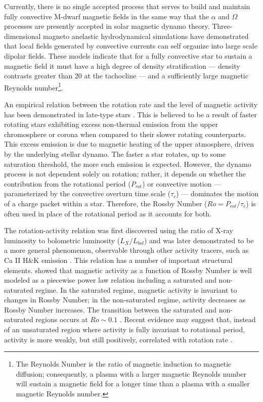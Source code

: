 Currently, there is no single accepted process that serves to build and
maintain fully convective M-dwarf magnetic fields in the same way that the
$\alpha$ and $\Omega$ processes are presently accepted in solar magnetic dynamo
theory. Three-dimensional magneto anelastic hydrodynamical simulations have
demonstrated that local fields generated by convective currents can self
organize into large scale dipolar fields. 
These models indicate that for a fully convective star to sustain a magnetic
field it must have a high degree of density stratification --- density
contrasts greater than 20 at the tachocline --- and a sufficiently large magnetic Reynolds
number\footnote{The Reynolds Number is the ratio of magnetic induction to
magnetic diffusion; consequently, a plasma with a larger magnetic Reynolds
number will  sustain a magnetic field for a longer time than a plasma with a
smaller magnetic Reynolds number.}.

An empirical relation between the rotation rate and the level of magnetic
activity has been demonstrated in late-type stars \citep{Skumanich1972, Pal81}.
This is believed to be a result of faster rotating stars exhibiting excess
non-thermal emission from the upper chromosphere or corona when compared to
their slower rotating counterparts. This excess emission is due to magnetic
heating of the upper atmosphere, driven by the underlying stellar dynamo. The
faster a star rotates, up to some saturation threshold, the more such emission
is expected. However, the dynamo process is not dependent solely on rotation;
rather, it depends on whether the contribution from the rotational period
($P_{rot}$) or convective motion --- parameterized by the convective overturn
time scale ($\tau_{c}$) --- dominates the motion of a charge packet within a
star. Therefore, the Rossby Number ($Ro = P_{rot}/\tau_{c}$) is often used in
place of the rotational period as it accounts for both.

The rotation-activity relation was first discovered using the ratio of X-ray
luminosity to bolometric luminosity ($L_{X}/L_{bol}$) \citep{Pal81} and was
later demonstrated to be a more general phenomenon, observable through other
activity tracers, such as Ca II H\&K emission \citep{Vilhu1984}. This relation has
a number of important structural elements. \citet{Noy84} showed that magnetic
activity as a function of Rossby Number is well modeled as a piecewise power
law relation including a saturated and non-saturated regime. In the saturated
regime, magnetic activity is invariant to changes in Rossby Number; in the
non-saturated regime, activity decreases as Rossby Number increases. The
transition between the saturated and non-saturated regions occurs at $Ro \sim
0.1$ \citep[e.g.][]{Wri11}. Recent evidence may suggest that, instead of an
unsaturated region where activity is fully invariant to rotational period,
activity is more weakly, but still positively, correlated with rotation rate
\citep{Mamajek2008, Reiners2014, Leh20, Magaudda2020}. 

